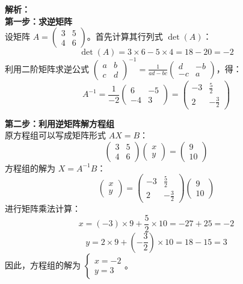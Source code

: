 \documentclass[12pt,a4paper]{exam-zh}
\begin{document}
\begin{solution}
    \textbf{解析：} \\
    \textbf{第一步：求逆矩阵} \\
    设矩阵 $\displaystyle A = \begin{pmatrix} 3 & 5 \\ 4 & 6 \end{pmatrix}$。首先计算其行列式 $\displaystyle \det(A)$：
    \[ \displaystyle \det(A) = 3 \times 6 - 5 \times 4 = 18 - 20 = -2 \]
    利用二阶矩阵求逆公式 $\displaystyle \begin{pmatrix} a & b \\ c & d \end{pmatrix}^{-1} = \frac{1}{ad-bc} \begin{pmatrix} d & -b \\ -c & a \end{pmatrix}$，得：
    \[ \displaystyle A^{-1} = \frac{1}{-2} \begin{pmatrix} 6 & -5 \\ -4 & 3 \end{pmatrix} = \begin{pmatrix} -3 & \frac{5}{2} \\ 2 & -\frac{3}{2} \end{pmatrix} \]

    \textbf{第二步：利用逆矩阵解方程组} \\
    原方程组可以写成矩阵形式 $\displaystyle AX = B$：
    \[ \displaystyle \begin{pmatrix} 3 & 5 \\ 4 & 6 \end{pmatrix} \begin{pmatrix} x \\ y \end{pmatrix} = \begin{pmatrix} 9 \\ 10 \end{pmatrix} \]
    方程组的解为 $\displaystyle X = A^{-1}B$：
    \[ \displaystyle \begin{pmatrix} x \\ y \end{pmatrix} = \begin{pmatrix} -3 & \frac{5}{2} \\ 2 & -\frac{3}{2} \end{pmatrix} \begin{pmatrix} 9 \\ 10 \end{pmatrix} \]
    进行矩阵乘法计算：
    \[ \displaystyle x = (-3) \times 9 + \frac{5}{2} \times 10 = -27 + 25 = -2 \]
    \[ \displaystyle y = 2 \times 9 + \left(-\frac{3}{2}\right) \times 10 = 18 - 15 = 3 \]
    因此，方程组的解为 $\displaystyle \begin{cases} x = -2 \\ y = 3 \end{cases}$。
\end{solution}
\end{document}

